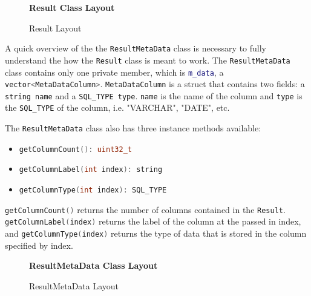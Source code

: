 \documentclass[letterpaper, 12pt]{article}
\newcommand{\inlinecode}[1]{\colorbox{codegrey}{\lstinline[language=C++]{#1}}}
\begin{document}
  \begin{figure}
    \centering
    \textbf{Result Class Layout}
    \caption{Result Layout}
  \end{figure}
  \par\vspace{\baselineskip}
  A quick overview of the the \inlinecode{ResultMetaData} class
  is necessary to fully understand the how the
  \inlinecode{Result} class is meant to work.
  The \inlinecode{ResultMetaData} class contains only one
  private member, which is
  \inlinecode{m_data}, a
  \inlinecode{vector<MetaDataColumn>}.
  \inlinecode{MetaDataColumn} is a struct that contains two fields:
  a \inlinecode{string name} and a
  \inlinecode{SQL_TYPE type}. \inlinecode{name}
  is the name of the column and \inlinecode{type} is the
  \inlinecode{SQL_TYPE} of the column, i.e. "VARCHAR", "DATE", etc.
  \par\vspace{\baselineskip}
  The \inlinecode{ResultMetaData} class also has
  three instance methods available:
  \begin{itemize}
    \item \inlinecode{getColumnCount(): uint32_t}
    \item \inlinecode{getColumnLabel(int index): string}
    \item \inlinecode{getColumnType(int index): SQL_TYPE}
  \end{itemize}

  \inlinecode{getColumnCount()} returns the number of
  columns contained in the \lstinline[basicstyle=\ttfamily]|Result|.
  \inlinecode{getColumnLabel(index)} returns the label of the
  column at the passed in index, and
  \inlinecode{getColumnType(index)} returns the type of data that
  is stored in the column specified by index.

  \begin{figure}
    \centering
    \textbf{ResultMetaData Class Layout}
    \caption{ResultMetaData Layout}
  \end{figure}

  \newpage
\end{document}
